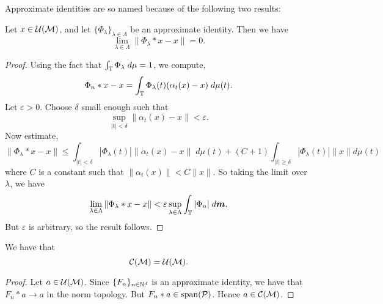 Approximate identities are so named because of the following two results:
\begin{proposition}
    Let $x \in \mathcal{U}(\mathcal{M})$, and let $\{\Phi_\lambda\}_{\lambda \in \Lambda}$ be an 
    approximate identity. Then we have
    \begin{equation}
        \lim_{\lambda \in \Lambda} \|\Phi_\lambda*x - x\| = 0.
    \end{equation}
\end{proposition}
\begin{proof}
    Using the fact that $\int_{\mathbb{T}} \Phi_\lambda\;d\mu = 1$, we compute,
    \begin{equation}
        \Phi_n*x-x = \int_{\mathbb{T}} \Phi_\lambda(t)(\alpha_t(x)-x)\;d\mu(t).
    \end{equation}
    Let $\varepsilon > 0$. Choose $\delta$ small enough such that
    \begin{equation}
        \sup_{|t| < \delta} \|\alpha_t(x)-x\| < \varepsilon.
    \end{equation}
    Now estimate,
    \begin{equation}
        \|\Phi_\lambda*x - x\| \leq \int_{|t| < \delta} |\Phi_\lambda(t)|\|\alpha_t(x)-x\|\;d\mu(t) + (C+1)\int_{|t| \geq \delta} |\Phi_\lambda(t)|\|x\| d\mu(t)
    \end{equation}
    where $C$ is a constant such that $\|\alpha_t(x)\| < C\|x\|$.
    So taking the limit over $\lambda$, we have
    \begin{equation}
        \lim_{\lambda \in \Lambda} \|\Phi_\lambda*x-x\| < \varepsilon \sup_{\lambda \in \Lambda} \int_{\mathbb{T}} |\Phi_n|\;d\boldsymbol{m}.
    \end{equation}
    But $\varepsilon$ is arbitrary, so the result follows.
\end{proof}

\begin{proposition}
    We have that
    \begin{equation}
        \mathcal{C}(\mathcal{M}) = \mathcal{U}(\mathcal{M}).
    \end{equation}
\end{proposition}
\begin{proof}
    Let $a \in \mathcal{U}(\mathcal{M})$. Since $\{F_n\}_{n\in\mathbb{N}^d}$ is an approximate identity, we have
    that $F_n*a\rightarrow a$ in the norm topology. But $F_n*a \in \operatorname{span}(\mathcal{P})$.
    Hence $a \in \mathcal{C}(\mathcal{M})$.
\end{proof}


